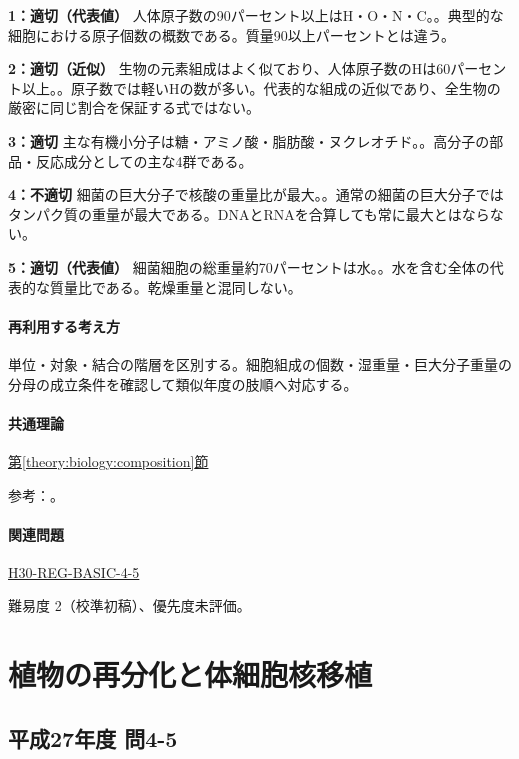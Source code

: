 \noindent\textbf{1：適切（代表値）} 人体原子数の90パーセント以上はH・O・N・C。。典型的な細胞における原子個数の概数である。質量90以上パーセントとは違う。\par

\noindent\textbf{2：適切（近似）} 生物の元素組成はよく似ており、人体原子数のHは60パーセント以上。。原子数では軽いHの数が多い。代表的な組成の近似であり、全生物の厳密に同じ割合を保証する式ではない。\par

\noindent\textbf{3：適切} 主な有機小分子は糖・アミノ酸・脂肪酸・ヌクレオチド。。高分子の部品・反応成分としての主な4群である。\par

\noindent\textbf{4：不適切} 細菌の巨大分子で核酸の重量比が最大。。通常の細菌の巨大分子ではタンパク質の重量が最大である。DNAとRNAを合算しても常に最大とはならない。\par

\noindent\textbf{5：適切（代表値）} 細菌細胞の総重量約70パーセントは水。。水を含む全体の代表的な質量比である。乾燥重量と混同しない。\par

\paragraph{再利用する考え方} 単位・対象・結合の階層を区別する。細胞組成の個数・湿重量・巨大分子重量の分母の成立条件を確認して類似年度の肢順へ対応する。

\paragraph{共通理論} \hyperref[theory:biology:composition]{第\ref*{theory:biology:composition}節}

\par 参考：\cite{bio_composition}。

\paragraph{関連問題} \hyperref[q:h30-reg-basic-4-5]{H30-REG-BASIC-4-5}

\par 難易度 2（校準初稿）、優先度未評価。

\section{植物の再分化と体細胞核移植}

\subsection{平成27年度 問4-5}
\label{q:h27-reg-basic-4-5}


